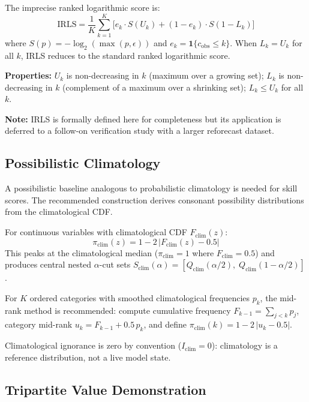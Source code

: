 The imprecise ranked logarithmic score is:
\begin{equation}
\mathrm{IRLS} = \frac{1}{K} \sum_{k=1}^{K} \bigl[e_k \cdot S(U_k) + (1 - e_k) \cdot S(1 - L_k)\bigr] \label{eq:irls}
\end{equation}
where $S(p) = -\log_2(\max(p, \epsilon))$ and $e_k = \mathbf{1}\{c_{\mathrm{obs}} \leq k\}$. When $L_k = U_k$ for all $k$, IRLS reduces to the standard ranked logarithmic score.

\textbf{Properties:} $U_k$ is non-decreasing in $k$ (maximum over a growing set); $L_k$ is non-decreasing in $k$ (complement of a maximum over a shrinking set); $L_k \leq U_k$ for all $k$.

\textbf{Note:} IRLS is formally defined here for completeness but its application is deferred to a follow-on verification study with a larger reforecast dataset.

\subsection{Possibilistic Climatology}\label{sec:poss_climatology}

A possibilistic baseline analogous to probabilistic climatology is needed for skill scores. The recommended construction derives consonant possibility distributions from the climatological CDF.

For continuous variables with climatological CDF $F_{\mathrm{clim}}(z)$:
\begin{equation}
\pi_{\mathrm{clim}}(z) = 1 - 2\,\bigl|F_{\mathrm{clim}}(z) - 0.5\bigr| \label{eq:poss_clim}
\end{equation}
This peaks at the climatological median ($\pi_{\mathrm{clim}} = 1$ where $F_{\mathrm{clim}} = 0.5$) and produces central nested $\alpha$-cut sets $S_{\mathrm{clim}}(\alpha) = [Q_{\mathrm{clim}}(\alpha/2),\; Q_{\mathrm{clim}}(1 - \alpha/2)]$.

For $K$ ordered categories with smoothed climatological frequencies $p_k$, the mid-rank method is recommended: compute cumulative frequency $F_{k-1} = \sum_{j < k} p_j$, category mid-rank $u_k = F_{k-1} + 0.5\, p_k$, and define $\pi_{\mathrm{clim}}(k) = 1 - 2\,|u_k - 0.5|$.

Climatological ignorance is zero by convention ($I_{\mathrm{clim}} = 0$): climatology is a reference distribution, not a live model state.

\subsection{Tripartite Value Demonstration}\label{sec:tripartite_demo}

